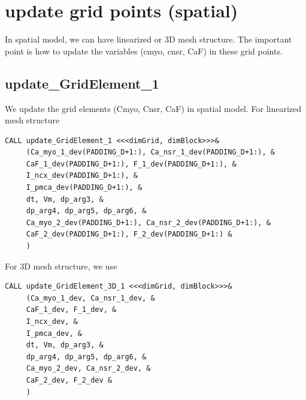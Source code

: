 \section{update grid points (spatial)}
\label{sec:update_grid_point}

In spatial model, we can have linearized or 3D mesh structure. The important
point is how to update the variables (cmyo, cnsr, CaF) in these grid points.

\subsection{update\_GridElement\_1}
\label{sec:update_gridelement_1}

We update the grid elements (Cmyo, Cnsr, CaF) in spatial model. For linearized
mesh structure
\begin{verbatim}
CALL update_GridElement_1 <<<dimGrid, dimBlock>>>&
     (Ca_myo_1_dev(PADDING_D+1:), Ca_nsr_1_dev(PADDING_D+1:), &
     CaF_1_dev(PADDING_D+1:), F_1_dev(PADDING_D+1:), &
     I_ncx_dev(PADDING_D+1:), &
     I_pmca_dev(PADDING_D+1:), &
     dt, Vm, dp_arg3, &
     dp_arg4, dp_arg5, dp_arg6, &
     Ca_myo_2_dev(PADDING_D+1:), Ca_nsr_2_dev(PADDING_D+1:), &
     CaF_2_dev(PADDING_D+1:), F_2_dev(PADDING_D+1:) &
     )
\end{verbatim}
For 3D mesh structure, we use
\begin{verbatim}
CALL update_GridElement_3D_1 <<<dimGrid, dimBlock>>>&
     (Ca_myo_1_dev, Ca_nsr_1_dev, &
     CaF_1_dev, F_1_dev, &
     I_ncx_dev, &
     I_pmca_dev, &
     dt, Vm, dp_arg3, &
     dp_arg4, dp_arg5, dp_arg6, &
     Ca_myo_2_dev, Ca_nsr_2_dev, &
     CaF_2_dev, F_2_dev &
     )
\end{verbatim}

